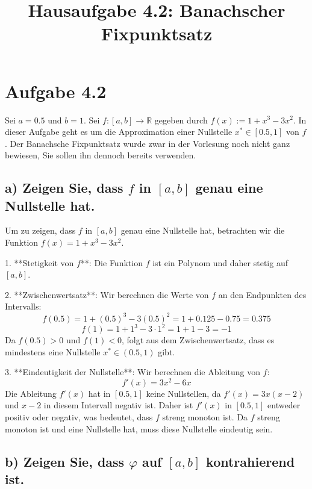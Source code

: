 \documentclass[a4paper,12pt]{article}
\title{Hausaufgabe 4.2: Banachscher Fixpunktsatz}
\author{}
\date{}
\begin{document}
\maketitle

\section*{Aufgabe 4.2}

Sei \( a = 0.5 \) und \( b = 1 \). Sei \( f : [a, b] \to \mathbb{R} \) gegeben durch \( f(x) := 1 + x^3 - 3x^2 \). In dieser Aufgabe geht es um die Approximation einer Nullstelle \( x^* \in [0.5, 1] \) von \( f \). Der Banachsche Fixpunktsatz wurde zwar in der Vorlesung noch nicht ganz bewiesen, Sie sollen ihn dennoch bereits verwenden.

\subsection*{a) Zeigen Sie, dass \( f \) in \([a, b]\) genau eine Nullstelle hat.}

Um zu zeigen, dass \( f \) in \([a, b]\) genau eine Nullstelle hat, betrachten wir die Funktion \( f(x) = 1 + x^3 - 3x^2 \).

1. **Stetigkeit von \( f \)**: Die Funktion \( f \) ist ein Polynom und daher stetig auf \([a, b]\).

2. **Zwischenwertsatz**: Wir berechnen die Werte von \( f \) an den Endpunkten des Intervalls:
   \[
   f(0.5) = 1 + (0.5)^3 - 3(0.5)^2 = 1 + 0.125 - 0.75 = 0.375
   \]
   \[
   f(1) = 1 + 1^3 - 3 \cdot 1^2 = 1 + 1 - 3 = -1
   \]
   Da \( f(0.5) > 0 \) und \( f(1) < 0 \), folgt aus dem Zwischenwertsatz, dass es mindestens eine Nullstelle \( x^* \in (0.5, 1) \) gibt.

3. **Eindeutigkeit der Nullstelle**: Wir berechnen die Ableitung von \( f \):
   \[
   f'(x) = 3x^2 - 6x
   \]
   Die Ableitung \( f'(x) \) hat in \([0.5, 1]\) keine Nullstellen, da \( f'(x) = 3x(x - 2) \) und \( x - 2 \) in diesem Intervall negativ ist. Daher ist \( f'(x) \) in \([0.5, 1]\) entweder positiv oder negativ, was bedeutet, dass \( f \) streng monoton ist. Da \( f \) streng monoton ist und eine Nullstelle hat, muss diese Nullstelle eindeutig sein.

\subsection*{b) Zeigen Sie, dass \( \varphi \) auf \([a, b]\) kontrahierend ist.}
\end{document}
